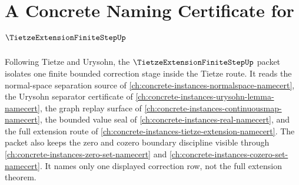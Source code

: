 \chapter{A Concrete Naming Certificate for $\TietzeExtensionFiniteStepUp$}
\label{ch:concrete-instances-tietze-extension-finite-step-namecert}

Following Tietze and Urysohn, the $\TietzeExtensionFiniteStepUp$ packet isolates one finite bounded correction stage inside the Tietze route. It reads the normal-space separation source of \autoref{ch:concrete-instances-normalspace-namecert}, the Urysohn separator certificate of \autoref{ch:concrete-instances-urysohn-lemma-namecert}, the graph replay surface of \autoref{ch:concrete-instances-continuousmap-namecert}, the bounded value seal of \autoref{ch:concrete-instances-real-namecert}, and the full extension route of \autoref{ch:concrete-instances-tietze-extension-namecert}. The packet also keeps the zero and cozero boundary discipline visible through \autoref{ch:concrete-instances-zero-set-namecert} and \autoref{ch:concrete-instances-cozero-set-namecert}. It names only one displayed correction row, not the full extension theorem.

